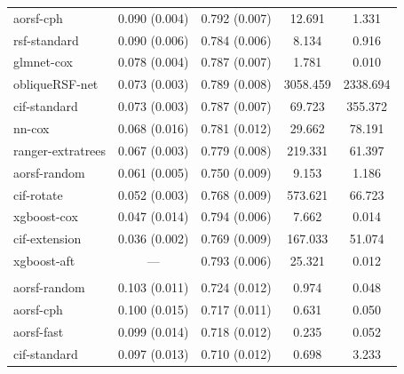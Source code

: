 \documentclass[12pt]{article}\usepackage[]{graphicx}\usepackage[]{xcolor}
\newenvironment{knitrout}{}{} %
\begin{document}
\begin{knitrout}
\begin{longtable}[t]{lcccc}
\hspace{1em}aorsf-cph & 0.090 (0.004) & 0.792 (0.007) & 12.691 & 1.331\\
\hspace{1em}rsf-standard & 0.090 (0.006) & 0.784 (0.006) & 8.134 & 0.916\\
\hspace{1em}glmnet-cox & 0.078 (0.004) & 0.787 (0.007) & 1.781 & 0.010\\
\hspace{1em}obliqueRSF-net & 0.073 (0.003) & 0.789 (0.008) & 3058.459 & 2338.694\\
\hspace{1em}cif-standard & 0.073 (0.003) & 0.787 (0.007) & 69.723 & 355.372\\
\hspace{1em}nn-cox & 0.068 (0.016) & 0.781 (0.012) & 29.662 & 78.191\\
\hspace{1em}ranger-extratrees & 0.067 (0.003) & 0.779 (0.008) & 219.331 & 61.397\\
\hspace{1em}aorsf-random & 0.061 (0.005) & 0.750 (0.009) & 9.153 & 1.186\\
\hspace{1em}cif-rotate & 0.052 (0.003) & 0.768 (0.009) & 573.621 & 66.723\\
\hspace{1em}xgboost-cox & 0.047 (0.014) & 0.794 (0.006) & 7.662 & 0.014\\
\hspace{1em}cif-extension & 0.036 (0.002) & 0.769 (0.009) & 167.033 & 51.074\\
\hspace{1em}xgboost-aft & --- & 0.793 (0.006) & 25.321 & 0.012\\
\addlinespace[0.3em]
\multicolumn{5}{l}{\textit{\textbf{Colon cancer; death, n = 929, p = 12}}}\\
\hline
\hspace{1em}aorsf-random & 0.103 (0.011) & 0.724 (0.012) & 0.974 & 0.048\\
\hspace{1em}aorsf-cph & 0.100 (0.015) & 0.717 (0.011) & 0.631 & 0.050\\
\hspace{1em}aorsf-fast & 0.099 (0.014) & 0.718 (0.012) & 0.235 & 0.052\\
\hspace{1em}cif-standard & 0.097 (0.013) & 0.710 (0.012) & 0.698 & 3.233\\

\end{longtable}
\end{knitrout}
\end{document}
